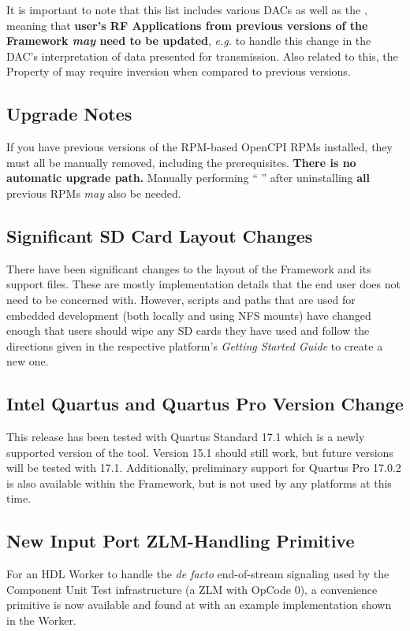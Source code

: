 It is important to note that this list includes various DACs as well as the , meaning that \textbf{user's RF Applications from previous versions of the Framework \textit{may} need to be updated}, \textit{e.g.} to handle this change in the DAC's interpretation of data presented for transmission. Also related to this, the  Property of  may require inversion when compared to previous versions.

\subsection{Upgrade Notes}
If you have previous versions of the RPM-based OpenCPI RPMs installed, they must all be manually removed, including the prerequisites. \textbf{There is no automatic upgrade path.} Manually performing `` '' after uninstalling \textbf{all} previous RPMs \textit{may} also be needed.

\subsection{Significant SD Card Layout Changes} %
\label{sec:14_sdcard}
There have been significant changes to the layout of the Framework and its support files. These are mostly implementation details that the end user does not need to be concerned with. However, scripts and paths that are used for embedded development (both locally and using NFS mounts) have changed enough that users should wipe any SD cards they have used and follow the directions given in the respective platform's \textit{Getting Started Guide} to create a new one.

\subsection{Intel Quartus and Quartus Pro Version Change} %
This release has been tested with Quartus Standard 17.1 which is a newly supported version of the tool. Version 15.1 should still work, but future versions will be tested with 17.1. Additionally, preliminary support for Quartus Pro 17.0.2 is also available within the Framework, but is not used by any platforms at this time.

\subsection{New Input Port ZLM-Handling Primitive} %
For an HDL Worker to handle the \textit{de facto} end-of-stream signaling used by the Component Unit Test infrastructure (a ZLM with OpCode 0), a convenience primitive is now available and found at  with an example implementation shown in the  Worker.

